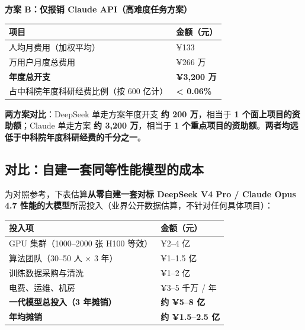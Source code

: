 \medskip
\textbf{方案 B：仅报销 Claude API（高难度任务方案）}

\begin{table}[h]
\centering
\renewcommand{\arraystretch}{1.3}
\begin{tabularx}{\textwidth}{@{}>{\raggedright\arraybackslash}X >{\raggedleft\arraybackslash}p{4.5cm}@{}}
\toprule
\rowcolor{primary!15}
\textbf{项目} & \textbf{金额（元）} \\
\midrule
人均月费用（加权平均） & ¥133 \\
2 万用户月度总费用 & ¥266 万 \\
\rowcolor{primary!8}
\textbf{年度总开支} & \textbf{¥3,200 万} \\
占中科院年度科研经费比例（按 600 亿计）& \textbf{< 0.06\%} \\
\bottomrule
\end{tabularx}
\end{table}

\textbf{两方案对比}：DeepSeek 单走方案年度开支 \textbf{约 200 万}，相当于 \textbf{1 个面上项目的资助额}；Claude 单走方案 \textbf{约 3,200 万}，相当于 \textbf{1 个重点项目的资助额}。\textbf{两者均远低于中科院年度科研经费的千分之一}。

\subsection{对比：自建一套同等性能模型的成本}

为对照参考，下表估算\textbf{从零自建一套对标 DeepSeek V4 Pro / Claude Opus 4.7 性能的大模型}所需投入（业界公开数据估算，不针对任何具体项目）：

\begin{table}[h]
\centering
\renewcommand{\arraystretch}{1.3}
\begin{tabularx}{\textwidth}{@{}>{\raggedright\arraybackslash}X >{\raggedleft\arraybackslash}p{4.5cm}@{}}
\toprule
\rowcolor{primary!15}
\textbf{投入项} & \textbf{金额（元）} \\
\midrule
GPU 集群（1000--2000 张 H100 等效） & ¥2--4 亿 \\
算法团队（30--50 人 × 3 年） & ¥1--1.5 亿 \\
训练数据采购与清洗 & ¥1--2 亿 \\
电费、运维、机房 & ¥3--5 千万 / 年 \\
\midrule
\rowcolor{primary!8}
\textbf{一代模型总投入（3 年摊销）} & \textbf{约 ¥5--8 亿} \\
\textbf{年均摊销} & \textbf{约 ¥1.5--2.5 亿} \\
\bottomrule
\end{tabularx}
\end{table}

